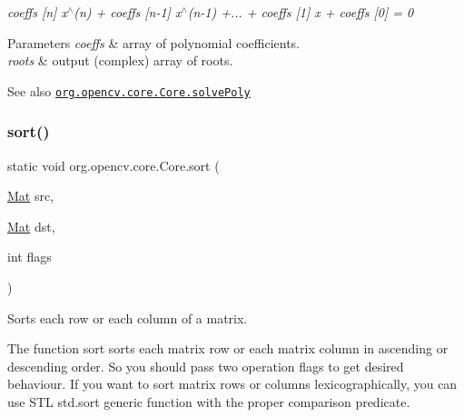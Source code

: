 {\itshape coeffs \mbox{[}n\mbox{]} x$^\wedge$(n) + coeffs \mbox{[}n-\/1\mbox{]} x$^\wedge$(n-\/1) +... + coeffs \mbox{[}1\mbox{]} x + coeffs \mbox{[}0\mbox{]} = 0}


\begin{DoxyParams}{Parameters}
{\em coeffs} & array of polynomial coefficients. \\
\hline
{\em roots} & output (complex) array of roots.\\
\hline
\end{DoxyParams}
\begin{DoxySeeAlso}{See also}
\href{http://docs.opencv.org/modules/core/doc/operations_on_arrays.html#solvepoly}{\tt org.\+opencv.\+core.\+Core.\+solve\+Poly} 
\end{DoxySeeAlso}
\mbox{\label{classorg_1_1opencv_1_1core_1_1_core_ae5b5fdaa4bafa45a5a43443016b037b6}} 
\subsubsection{\texorpdfstring{sort()}{sort()}}
{\footnotesize\ttfamily static void org.\+opencv.\+core.\+Core.\+sort (\begin{DoxyParamCaption}\item[{\mbox{\hyperlink{classorg_1_1opencv_1_1core_1_1_mat}{Mat}}}]{src,  }\item[{\mbox{\hyperlink{classorg_1_1opencv_1_1core_1_1_mat}{Mat}}}]{dst,  }\item[{int}]{flags }\end{DoxyParamCaption})\hspace{0.3cm}{\ttfamily [static]}}

Sorts each row or each column of a matrix.

The function {\ttfamily sort} sorts each matrix row or each matrix column in ascending or descending order. So you should pass two operation flags to get desired behaviour. If you want to sort matrix rows or columns lexicographically, you can use S\+TL {\ttfamily std.\+sort} generic function with the proper comparison predicate.


